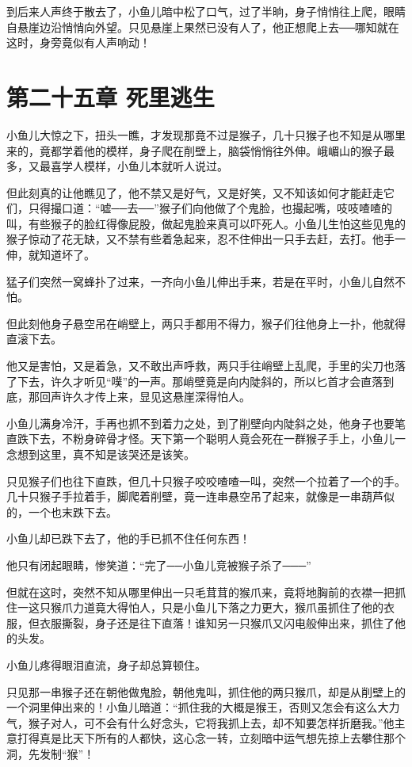 \documentclass[12pt,oneside]{book}
\begin{document}
到后来人声终于散去了，小鱼儿暗中松了口气，过了半晌，身子悄悄往上爬，眼睛自悬崖边沿悄悄向外望。只见悬崖上果然已没有人了，他正想爬上去──哪知就在这时，身旁竟似有人声响动！

\hypertarget{ux7b2cux4e8cux5341ux4e94ux7ae0-ux6b7bux91ccux9003ux751f}{%
\chapter{第二十五章
死里逃生}\label{ux7b2cux4e8cux5341ux4e94ux7ae0-ux6b7bux91ccux9003ux751f}}

小鱼儿大惊之下，扭头一瞧，才发现那竟不过是猴子，几十只猴子也不知是从哪里来的，竟都学着他的模样，身子爬在削壁上，脑袋悄悄往外伸。峨嵋山的猴子最多，又最喜学人模样，小鱼儿本就听人说过。

但此刻真的让他瞧见了，他不禁又是好气，又是好笑，又不知该如何才能赶走它们，只得撮口道：``嘘──去──''猴子们向他做了个鬼脸，也撮起嘴，吱吱喳喳的叫，有些猴子的脸红得像屁股，做起鬼脸来真可以吓死人。小鱼儿生怕这些见鬼的猴子惊动了花无缺，又不禁有些着急起来，忍不住伸出一只手去赶，去打。他手一伸，就知道坏了。

猛子们突然一窝蜂扑了过来，一齐向小鱼儿伸出手来，若是在平时，小鱼儿自然不怕。

但此刻他身子悬空吊在峭壁上，两只手都用不得力，猴子们往他身上一扑，他就得直滚下去。

他又是害怕，又是着急，又不敢出声呼救，两只手往峭壁上乱爬，手里的尖刀也落了下去，许久才听见``噗''的一声。那峭壁竟是向内陡斜的，所以匕首才会直落到底，那回声许久才传上来，显见这悬崖深得怕人。

小鱼儿满身冷汗，手再也抓不到着力之处，到了削壁向内陡斜之处，他身子也要笔直跌下去，不粉身碎骨才怪。天下第一个聪明人竟会死在一群猴子手上，小鱼儿一念想到这里，真不知是该哭还是该笑。

只见猴子们也往下直跌，但几十只猴子咬咬喳喳一叫，突然一个拉着了一个的手。几十只猴子手拉着手，脚爬着削壁，竟一连串悬空吊了起来，就像是一串葫芦似的，一个也末跌下去。

小鱼儿却已跌下去了，他的手已抓不住任何东西！

他只有闭起眼睛，惨笑道：``完了──小鱼儿竞被猴子杀了───''

但就在这时，突然不知从哪里伸出一只毛茸茸的猴爪来，竟将地胸前的衣襟一把抓住一这只猴爪力道竟大得怕人，只是小鱼儿下落之力更大，猴爪虽抓住了他的衣服，但衣服撕裂，身子还是往下直落！谁知另一只猴爪又闪电般伸出来，抓住了他的头发。

小鱼儿疼得眼泪直流，身子却总算顿住。

只见那一串猴子还在朝他做鬼脸，朝他鬼叫，抓住他的两只猴爪，却是从削壁上的一个洞里伸出来的！小鱼儿暗道：``抓住我的大概是猴王，否则又怎会有这么大力气，猴子对人，可不会有什么好念头，它将我抓上去，却不知要怎样折磨我。''他主意打得真是比天下所有的人都快，这心念一转，立刻暗中运气想先掠上去攀住那个洞，先发制``猴''！
\end{document}
